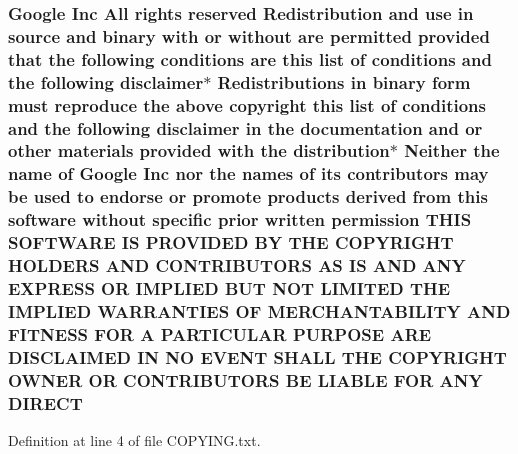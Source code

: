 \subsubsection[{\texorpdfstring{D\+I\+R\+E\+CT}{DIRECT}}]{\setlength{\rightskip}{0pt plus 5cm}Google Inc All rights reserved Redistribution and use in source and binary with or without are permitted provided that the following conditions are this {\bf list} of conditions and the following disclaimer$\ast$ Redistributions in binary form must reproduce the above copyright this {\bf list} of conditions and the following disclaimer in the documentation and or other materials provided with the distribution$\ast$ Neither the name of Google Inc nor the names of its contributors may be used to endorse or promote products derived from this software without specific prior written permission T\+H\+IS S\+O\+F\+T\+W\+A\+RE IS P\+R\+O\+V\+I\+D\+ED BY T\+HE C\+O\+P\+Y\+R\+I\+G\+HT H\+O\+L\+D\+E\+RS A\+ND C\+O\+N\+T\+R\+I\+B\+U\+T\+O\+RS AS IS A\+ND A\+NY E\+X\+P\+R\+E\+SS OR I\+M\+P\+L\+I\+ED B\+UT N\+OT L\+I\+M\+I\+T\+ED T\+HE I\+M\+P\+L\+I\+ED {\bf W\+A\+R\+R\+A\+N\+T\+I\+ES} OF M\+E\+R\+C\+H\+A\+N\+T\+A\+B\+I\+L\+I\+TY A\+ND F\+I\+T\+N\+E\+SS F\+OR A P\+A\+R\+T\+I\+C\+U\+L\+AR P\+U\+R\+P\+O\+SE A\+RE D\+I\+S\+C\+L\+A\+I\+M\+ED IN NO E\+V\+E\+NT S\+H\+A\+LL T\+HE C\+O\+P\+Y\+R\+I\+G\+HT O\+W\+N\+ER OR C\+O\+N\+T\+R\+I\+B\+U\+T\+O\+RS BE L\+I\+A\+B\+LE F\+OR A\+NY D\+I\+R\+E\+CT}\hypertarget{COPYING_8txt_ab085cad7c3d475ef9ae1bcc8bba9b189}{}\label{COPYING_8txt_ab085cad7c3d475ef9ae1bcc8bba9b189}


Definition at line 4 of file C\+O\+P\+Y\+I\+N\+G.\+txt.

